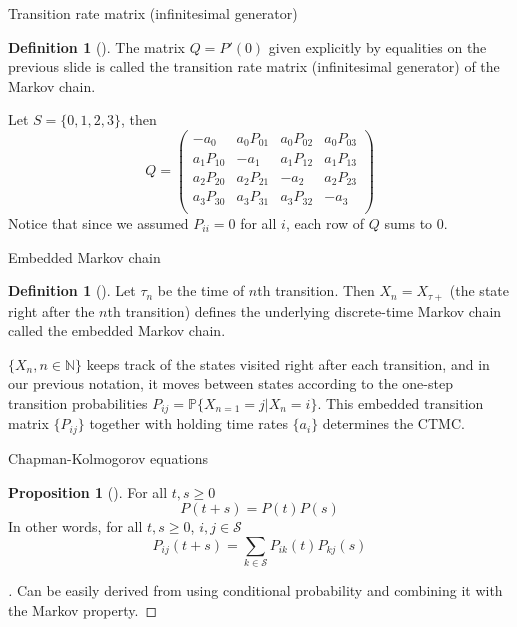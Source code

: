 \documentclass{beamer}%
\theoremstyle{definition}
\newtheorem{mydef}[theorem]{Definition}
\newtheorem{proposition}[theorem]{Proposition}
\renewcommand{\P}{\mathbb{P}}
\begin{document}
\begin{frame}{Transition rate matrix (infinitesimal generator)}

\begin{mydef}[]
The matrix $Q=P'(0)$ given explicitly by equalities on the previous slide is called the transition rate matrix (infinitesimal generator) of the Markov chain.
\end{mydef}
\begin{example}
Let $S=\{0, 1, 2, 3\}$, then
$$Q=\begin{pmatrix}
-a_0 & a_0P_{01} & a_0P_{02} & a_0P_{03} \\
a_1P_{10} & -a_1 & a_1P_{12} & a_1P_{13} \\
a_2P_{20} & a_2P_{21} & -a_2 & a_2P_{23} \\
a_3P_{30} & a_3P_{31} & a_3P_{32} & -a_3 \\
\end{pmatrix}$$
Notice that since we assumed $P_{ii}=0$ for all $i$, each row of $Q$ sums to $0$.
\end{example}

\end{frame}


\begin{frame}{Embedded Markov chain}

\begin{mydef}[]
Let $\tau_n$ be the time of $n$th transition. Then $X_n=X_{\tau+}$ (the state right after the $n$th transition) defines the underlying discrete-time Markov chain called the embedded Markov chain.
\end{mydef}
$\{X_n, n\in\mathbb{N}\}$ keeps track of the states visited right after each transition, and in our previous notation, it moves between states according to the one-step transition probabilities $P_{ij}=\P\{X_{n=1}=j|X_n=i\}$. This embedded transition matrix $\{P_{ij}\}$ together with holding time rates $\{a_i\}$ determines the CTMC.

\end{frame}


\begin{frame}{Chapman-Kolmogorov equations}

\begin{proposition}[]
For all $t, s\geqslant0$
$$P(t+s)=P(t)P(s)$$
In other words, for all $t, s\geqslant0$, $i, j\in\mathcal{S}$
$$P_{ij}(t+s)=\sum\limits_{k\in\mathcal{S}}P_{ik}(t)P_{kj}(s)$$
\end{proposition}
\begin{proof}[]
Can be easily derived from using conditional probability and combining it with the Markov property.
\end{proof}

\end{frame}
\end{document}
